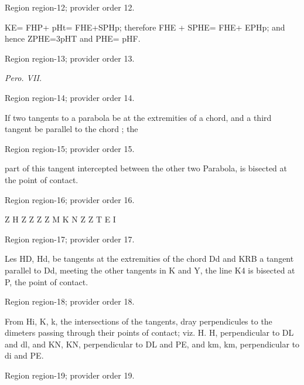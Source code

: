 \documentclass[11pt]{article}
\begin{document}
{\scriptsize\color{gray} Region region-12; provider order 12.\par}
\medskip

KE= FHP+ pHt= FHE+SPHp; therefore FHE + SPHE= FHE+ EPHp; and hence ZPHE=3pHT and PHE= pHF.
\par

{\scriptsize\color{gray} Region region-13; provider order 13.\par}
\medskip

{\small\itshape Pero. VII.\par}

{\scriptsize\color{gray} Region region-14; provider order 14.\par}
\medskip

If two tangents to a parabola be at the extremities of a chord, and a third tangent be parallel to the chord ; the
\par

{\scriptsize\color{gray} Region region-15; provider order 15.\par}
\medskip

part of this tangent intercepted between the other two Parabola, is bisected at the point of contact.
\par

{\scriptsize\color{gray} Region region-16; provider order 16.\par}
\medskip

Z
H
Z
Z
Z
Z
M
K
N
Z
Z
T
E
I
\par

{\scriptsize\color{gray} Region region-17; provider order 17.\par}
\medskip

Les HD, Hd, be tangents at the extremities of the chord Dd and KRB a tangent parallel to Dd, meeting the other tangents in K and Y, the line K4 is bisected at P, the point of contact.
\par

{\scriptsize\color{gray} Region region-18; provider order 18.\par}
\medskip

From Hi, K, k, the intersections of the tangents, dray perpendicules to the dimeters passing through their points of contact; viz. H. H, perpendicular to DL and dl, and KN, KN, perpendicular to DL and PE, and km, km, perpendicular to di and PE.
\par

{\scriptsize\color{gray} Region region-19; provider order 19.\par}
\medskip
\end{document}
